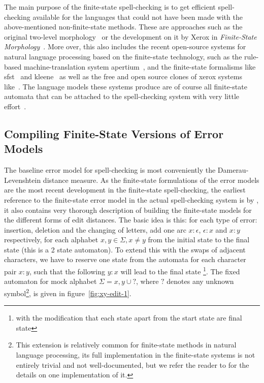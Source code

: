 \documentclass[a4paper,12pt]{article}
\begin{document}
The main purpose of the finite-state spell-checking is to get efficient
spell-checking available for the languages that could not have been made with
the above-mentioned non-finite-state methods. These are approaches such as the
original two-level morphology~\cite[]{koskenniemi/1983} or the development on
it by Xerox in \emph{Finite-State Morphology}~\cite[]{beesley2003finite}.  More
over, this also includes the recent open-source systems for natural language
processing based on the finite-state technology, such as the rule-based
machine-translation system apertium~\cite[]{apertium2010}, and the finite-state
formalisms like sfst~\cite[]{schmid2006programming} and
kleene~\cite[]{beesley2012kleene} as well as the free and open source clones of
xerox systems like~\cite{hfst,foma}.  The language models these systems produce
are of course all finite-state automata that can be attached to the
spell-checking system with very little
effort~\cite[e.g.][]{pirinen2012compiling}.

\subsection{Compiling Finite-State Versions of Error Models}
\label{subsec:error-models}

The baseline error model for spell-checking is most conveniently the
Damerau-Levenshtein distance measure. As the finite-state formulations of the
error models are the most recent development in the finite-state spell-checking,
the earliest reference to the finite-state error model in the actual spell-checking
system is by \cite{schulz/2002}, it also contains very thorough description of
building the finite-state models for the different forms of edit distances. The basic
idea is this: for each type of error: insertion, deletion and the changing of
letters, add one arc $x:\epsilon$, $\epsilon:x$ and $x:y$ respectively, for
each alphabet $x, y \in \Sigma, x \neq y$ from the initial state to the final
state (this is a 2 state automaton). To extend this with the swaps of adjacent
characters, we have to reserve one state from the automata for each character
pair $x:y$, such that the following $y:x$ will lead to the final state
\cite[]{pirinen/2010/lrec}\footnote{with the modification that each state apart
from the start state are final state}.
The fixed automaton for mock alphabet $\Sigma = {x, y} \cup {?}$, where $?$
denotes any unknown symbol\footnote{This extension is relatively common for
    finite-state methods in natural language processing, its full
    implementation in the finite-state systems is not entirely trivial and not
    well-documented, but we refer the reader to \cite[]{beesley2003finite} for
    the details on one implementation of it.}, is given in
    figure~\ref{fig:xy-edit-1}.
\end{document}
